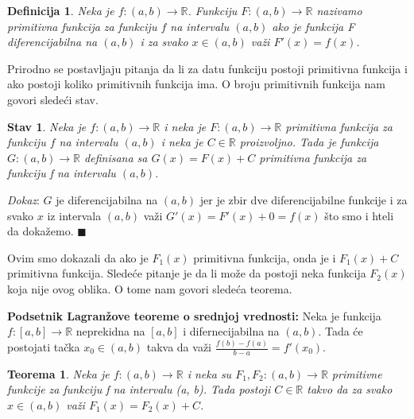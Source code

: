 \documentclass{article}
\newtheorem{definicija}{Definicija}[section]
\newtheorem{teorema}{Teorema}[section]
\newtheorem{stav}{Stav}[section]
\begin{document}
\begin{defbox}
    \begin{definicija}
        Neka je $f:(a, b) \longrightarrow \mathbb{R}$.
        Funkciju $F:(a, b) \longrightarrow \mathbb{R}$ nazivamo primitivna
        funkcija za funkciju $f$ na intervalu $(a, b)$ ako je funkcija F
        diferencijabilna na $(a, b)$ i za svako $x \in (a,b)$ važi
        $F'(x) = f(x)$.
    \end{definicija}
\end{defbox}
Prirodno se postavljaju pitanja da li za datu funkciju postoji
primitivna funkcija i ako postoji koliko primitivnih funkcija ima.
O broju primitivnih funkcija nam govori sledeći stav.
\begin{stavbox}
    \begin{stav}
        Neka je $f: (a, b) \longrightarrow \mathbb{R}$
        i neka je $F: (a,b) \longrightarrow \mathbb{R}$
        primitivna funkcija za funkciju $f$ na intervalu $(a, b)$
        i neka je $C \in \mathbb{R}$ proizvoljno. Tada je
        funkcija $G: (a, b) \longrightarrow \mathbb{R}$
        definisana sa $G(x) = F(x) + C$ primitivna funkcija za
        funkciju f na intervalu $(a, b)$.
    \end{stav}
\end{stavbox}
\textit{Dokaz}: $G$ je diferencijabilna na $(a, b)$ jer je zbir dve
diferencijabilne funkcije i za svako $x$ iz intervala $(a, b)$ važi $G'(x) = F'(x) + 0 = f(x)$
što smo i hteli da dokažemo.
\null\hfill $\blacksquare$\par
Ovim smo dokazali da ako je $F_1(x)$ primitivna funkcija, onda
je i $F_1(x)+C$ primitivna funkcija. Sledeće pitanje je da li
može da postoji neka funkcija $F_2(x)$ koja nije ovog oblika.
O tome nam govori sledeća teorema.

\begin{teoremabox}
    \textbf{Podsetnik Lagranžove teoreme o srednjoj vrednosti:} Neka je funkcija
    $f : [a,b]\longrightarrow\mathbb{R}$ neprekidna na $[a,b]$
    i difernecijabilna na $(a,b)$. Tada će
    postojati tačka $x_0\in(a,b)$ takva da važi
    $\frac{f(b)-f(a)}{b-a}=f'(x_0)$.
\end{teoremabox}
\begin{teoremabox}
    \begin{teorema}
        Neka je $f: (a, b) \longrightarrow \mathbb{R}$ i
        neka su $F_1, F_2: (a,b) \longrightarrow \mathbb{R}$
        primitivne funkcije za funkciju f na intervalu (a, b).
        Tada postoji $C \in \mathbb{R}$ takvo da
        za svako $x\in(a, b)$ važi $F_1(x) = F_2(x) + C$.
    \end{teorema}
\end{teoremabox}
\end{document}
